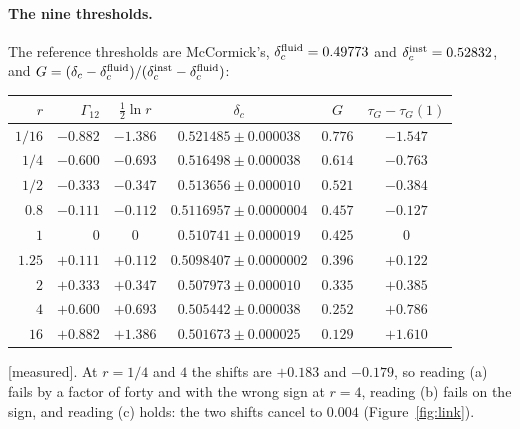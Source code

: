 \documentclass[11pt]{article}
\newcommand{\grade}[1]{\textsf{\small[#1]}}
\begin{document}
\paragraph{The nine thresholds.} The reference thresholds are McCormick's, $\delta_c^{\rm fluid}=0.49773$ and $\delta_c^{\rm inst}=0.52832$, and $G=(\delta_c-\delta_c^{\rm fluid})/(\delta_c^{\rm inst}-\delta_c^{\rm fluid})$:
\begin{center}\begin{tabular}{rrcccc}\toprule
$r$ & $\Gamma_{12}$ & $\tfrac12\ln r$ & $\delta_c$ & $G$ & $\tau_G-\tau_G(1)$\\\midrule
$1/16$ & $-0.882$ & $-1.386$ & $0.521485\pm0.000038$ & $0.776$ & $-1.547$\\
$1/4$ & $-0.600$ & $-0.693$ & $0.516498\pm0.000038$ & $0.614$ & $-0.763$\\
$1/2$ & $-0.333$ & $-0.347$ & $0.513656\pm0.000010$ & $0.521$ & $-0.384$\\
$0.8$ & $-0.111$ & $-0.112$ & $0.5116957\pm0.0000004$ & $0.457$ & $-0.127$\\
$1$ & $0$ & $0$ & $0.510741\pm0.000019$ & $0.425$ & $0$\\
$1.25$ & $+0.111$ & $+0.112$ & $0.5098407\pm0.0000002$ & $0.396$ & $+0.122$\\
$2$ & $+0.333$ & $+0.347$ & $0.507973\pm0.000010$ & $0.335$ & $+0.385$\\
$4$ & $+0.600$ & $+0.693$ & $0.505442\pm0.000038$ & $0.252$ & $+0.786$\\
$16$ & $+0.882$ & $+1.386$ & $0.501673\pm0.000025$ & $0.129$ & $+1.610$\\\bottomrule\end{tabular}\end{center}
\grade{measured}. At $r=1/4$ and $4$ the shifts are $+0.183$ and $-0.179$, so reading (a) fails by a factor of forty and with the wrong sign at $r=4$, reading (b) fails on the sign, and reading (c) holds: the two shifts cancel to $0.004$ (Figure~\ref{fig:link}).
\end{document}

